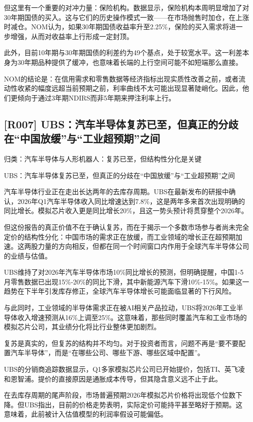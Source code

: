 \documentclass[11pt]{ctexart}
\begin{document}
但这里有一个重要的对冲力量：保险机构。数据显示，保险机构本周明显增加了对30年期国债的买入。这与它们的历史操作模式一致——在市场抛售时加仓，在上涨时减仓。NOM认为，如果30年期国债收益率升至2.25\%，保险的买入需求将进一步增强，从而对收益率上行形成一定封顶。

此外，目前10年期与30年期国债的利差约为49个基点，处于较宽水平。这一利差本身为30年期品种提供了缓冲，也意味着长端的上行空间可能不如短端那么直接。

NOM的结论是：在信用需求和零售数据等经济指标出现实质性改善之前，或者流动性收紧的幅度远超当前预期之前，利率曲线不太可能出现显著陡峭化。因此，他们更倾向于通过3年期NDIRS而非5年期来押注利率上行。

\subsection{[R007] UBS：汽车半导体复苏已至，但真正的分歧在“中国放缓”与“工业超预期”之间}
{\small\color{refgray}归类：汽车半导体与人形机器人：复苏已至，但结构性分化是关键}

UBS：汽车半导体复苏已至，但真正的分歧在“中国放缓”与“工业超预期”之间

汽车半导体行业正在走出长达两年的去库存周期。UBS在最新发布的研报中确认，2026年Q1汽车半导体收入同比增速达到7.8\%，这是两年多来首次出现明确的同比增长。模拟芯片收入更是同比增长20\%，且这一势头预计将贯穿整个2026年。

但这份报告的真正价值不在于确认复苏，而在于揭示一个多数市场参与者尚未完全定价的结构性分化：中国市场的需求正在放缓，而工业领域的增长正在超预期加速。这两股力量的方向相反，但都在同一个时间窗口内作用于全球汽车半导体公司的业绩与估值。

UBS维持了对2026年汽车半导体市场10\%同比增长的预测，但明确提醒，中国1-5月零售数据已出现15\%-20\%的同比下滑，其中新能源汽车下滑10\%-15\%。如果这一趋势在下半年引发库存修正，全球汽车半导体增长可能面临显著的下行风险。

与此同时，工业领域的半导体需求正在被AI相关产品拉动，UBS将2026年工业半导体收入增速预测从16\%上调至25\%。这意味着，那些同时覆盖汽车和工业市场的模拟芯片公司，其业绩分化将比行业整体更加剧烈。

复苏是真实的，但复苏的结构并不均匀。对于投资者而言，问题不再是“要不要配置汽车半导体”，而是“在哪些公司、哪些下游、哪些区域中配置”。

UBS的分销商追踪数据显示，Q1多家模拟芯片公司已开始提价，包括TI、英飞凌和恩智浦。提价的直接原因是通胀成本传导，但其隐含意义远不止于此。

在去库存周期的尾声阶段，市场普遍预期2026年模拟芯片价格将出现低个位数下降。但UBS指出，目前的价格走势表明，实际定价可能持平甚至略好于预期。这意味着，此前被计入估值模型的利润率假设可能偏低。
\end{document}

